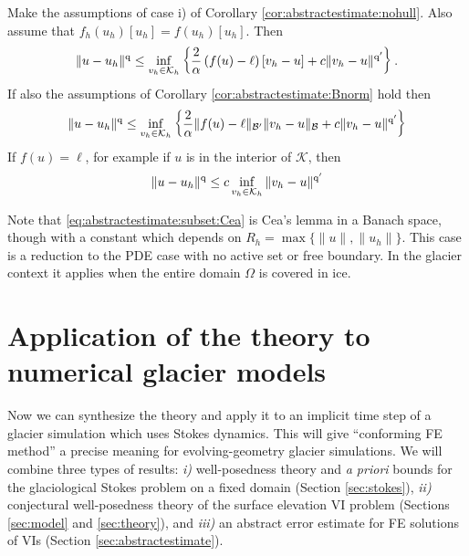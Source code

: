 \documentclass[hidelinks,onefignum,onetabnum,final]{siamart220329}  %
\newcommand{\cB}{\mathcal{B}}
\newcommand{\cK}{\mathcal{K}}
\newcommand{\qq}{{\text{\textnormal{q}}}}
\begin{document}
\begin{corollary}  \label{cor:abstractestimate:various}  Make the assumptions of case i) of Corollary \ref{cor:abstractestimate:nohull}.  Also assume that $f_h(u_h)[u_h] = f(u_h)[u_h]$.  Then
\begin{equation}
\|u-u_h\|^\qq \le  \inf_{v_h\in\cK_h} \left\{\frac{2}{\alpha} \left(f(u)-\ell\right)[v_h-u] + c \|v_h - u\|^{\qq'}\right\}. \label{eq:abstractestimate:subset}
\end{equation}
If also the assumptions of Corollary \ref{cor:abstractestimate:Bnorm} hold then
\begin{equation}
\|u-u_h\|^\qq \le \inf_{v_h\in\cK_h} \left\{\frac{2}{\alpha} \|f(u)-\ell\|_{\cB'} \|v_h-u\|_{\cB} + c \|v_h-u\|^{\qq'}\right\} \label{eq:abstractestimate:subset:Bnorm}
\end{equation}
If $f(u)=\ell$, for example if $u$ is in the interior of $\cK$, then
\begin{equation}
\|u-u_h\|^\qq \le c \inf_{v_h\in\cK_h} \|v_h-u\|^{\qq'} \label{eq:abstractestimate:subset:Cea}
\end{equation}
\end{corollary}

Note that \eqref{eq:abstractestimate:subset:Cea} is Cea's lemma \cite[Theorem 2.4.1]{Ciarlet2002} in a Banach space, though with a constant which depends on $R_h=\max\{\|u\|,\|u_h\|\}$.  This case is a reduction to the PDE case with no active set or free boundary.  In the glacier context it applies when the entire domain $\Omega$ is covered in ice.


\section{Application of the theory to numerical glacier models} \label{sec:application}

Now we can synthesize the theory and apply it to an implicit time step of a glacier simulation which uses Stokes dynamics.  This will give ``conforming FE method'' a precise meaning for evolving-geometry glacier simulations.  We will combine three types of results: \emph{i)} well-posedness theory and \emph{a priori} bounds for the glaciological Stokes problem on a fixed domain (Section \ref{sec:stokes}), \emph{ii)} conjectural well-posedness theory of the surface elevation VI problem (Sections \ref{sec:model} and \ref{sec:theory}), and \emph{iii)} an abstract error estimate for FE solutions of VIs (Section \ref{sec:abstractestimate}).
\end{document}
